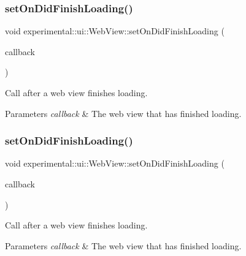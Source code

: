 \subsubsection{\texorpdfstring{set\+On\+Did\+Finish\+Loading()}{setOnDidFinishLoading()}\hspace{0.1cm}{\footnotesize\ttfamily [1/2]}}
{\footnotesize\ttfamily void experimental\+::ui\+::\+Web\+View\+::set\+On\+Did\+Finish\+Loading (\begin{DoxyParamCaption}\item[{const \hyperlink{classexperimental_1_1ui_1_1WebView_a11ddd376a5996eff614857f236b2b69d}{cc\+Web\+View\+Callback} \&}]{callback }\end{DoxyParamCaption})}

Call after a web view finishes loading.


\begin{DoxyParams}{Parameters}
{\em callback} & The web view that has finished loading. \\
\hline
\end{DoxyParams}
\mbox{\label{classexperimental_1_1ui_1_1WebView_a6fb8d736506be3151a8a5e3f08d6b7ea}} 
\subsubsection{\texorpdfstring{set\+On\+Did\+Finish\+Loading()}{setOnDidFinishLoading()}\hspace{0.1cm}{\footnotesize\ttfamily [2/2]}}
{\footnotesize\ttfamily void experimental\+::ui\+::\+Web\+View\+::set\+On\+Did\+Finish\+Loading (\begin{DoxyParamCaption}\item[{const \hyperlink{classexperimental_1_1ui_1_1WebView_a11ddd376a5996eff614857f236b2b69d}{cc\+Web\+View\+Callback} \&}]{callback }\end{DoxyParamCaption})}

Call after a web view finishes loading.


\begin{DoxyParams}{Parameters}
{\em callback} & The web view that has finished loading. \\
\hline
\end{DoxyParams}
\mbox{\label{classexperimental_1_1ui_1_1WebView_a434bac1a0a15294300ada912b85c35f4}} 
